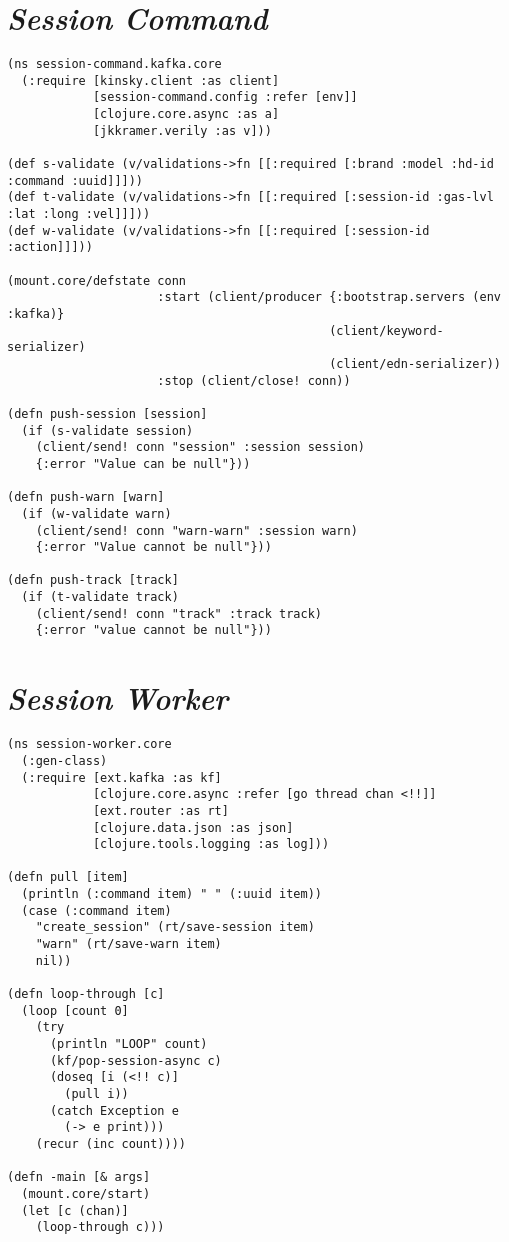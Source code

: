 \begin{apendicesenv}


\chapter{\textit{Session Command}}

\begin{lstlisting}
(ns session-command.kafka.core
  (:require [kinsky.client :as client]
            [session-command.config :refer [env]]
            [clojure.core.async :as a]
            [jkkramer.verily :as v]))

(def s-validate (v/validations->fn [[:required [:brand :model :hd-id :command :uuid]]]))
(def t-validate (v/validations->fn [[:required [:session-id :gas-lvl :lat :long :vel]]]))
(def w-validate (v/validations->fn [[:required [:session-id :action]]]))

(mount.core/defstate conn
                     :start (client/producer {:bootstrap.servers (env :kafka)}
                                             (client/keyword-serializer)
                                             (client/edn-serializer))
                     :stop (client/close! conn))

(defn push-session [session]
  (if (s-validate session)
    (client/send! conn "session" :session session)
    {:error "Value can be null"}))

(defn push-warn [warn]
  (if (w-validate warn)
    (client/send! conn "warn-warn" :session warn)
    {:error "Value cannot be null"}))

(defn push-track [track]
  (if (t-validate track)
    (client/send! conn "track" :track track)
    {:error "value cannot be null"}))
\end{lstlisting}

\chapter{\textit{Session Worker}}
\begin{lstlisting}
(ns session-worker.core
  (:gen-class)
  (:require [ext.kafka :as kf]
            [clojure.core.async :refer [go thread chan <!!]]
            [ext.router :as rt]
            [clojure.data.json :as json]
            [clojure.tools.logging :as log]))

(defn pull [item]
  (println (:command item) " " (:uuid item))
  (case (:command item)
    "create_session" (rt/save-session item)
    "warn" (rt/save-warn item)
    nil))

(defn loop-through [c]
  (loop [count 0]
    (try
      (println "LOOP" count)
      (kf/pop-session-async c)
      (doseq [i (<!! c)]
        (pull i))
      (catch Exception e
        (-> e print)))
    (recur (inc count))))

(defn -main [& args]
  (mount.core/start)
  (let [c (chan)]
    (loop-through c)))
\end{lstlisting}


\end{apendicesenv}